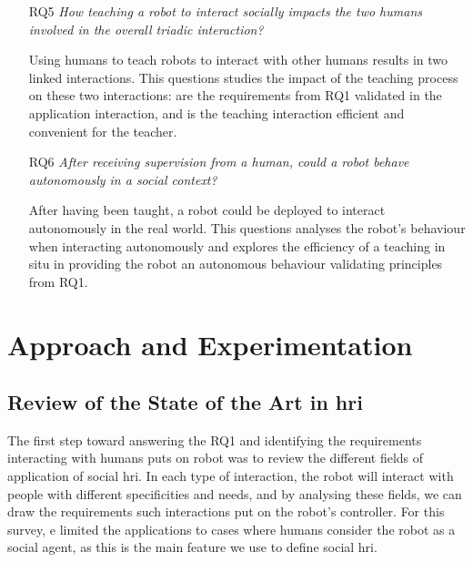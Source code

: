 \begin{itemize}
	\item [RQ5] \emph{How teaching a robot to interact socially impacts the two humans involved in the overall triadic interaction?}

		Using humans to teach robots to interact with other humans results in two linked interactions. This questions studies the impact of the teaching process on these two interactions: are the requirements from RQ1 validated in the application interaction, and is the teaching interaction efficient and convenient for the teacher.
		
    \item [RQ6] \emph{After receiving supervision from a human, could a robot behave autonomously in a social context?}

	 	After having been taught, a robot could be deployed to interact autonomously in the real world. This questions analyses the robot's behaviour when interacting autonomously and explores the efficiency of a teaching in situ in providing the robot an autonomous behaviour validating principles from RQ1.
	 
\end{itemize}

\section{Approach and Experimentation}

\subsection{Review of the State of the Art in \gls{hri}}
The first step toward answering the RQ1 and identifying the requirements interacting with humans puts on robot was to review the different fields of application of social \gls{hri}. In each type of interaction, the robot will interact with people with different specificities and needs, and by analysing these fields, we can draw the requirements such interactions put on the robot's controller. For this survey, e limited the applications to cases where humans consider the robot as a social agent, as this is the main feature we use to define social \gls{hri}.

